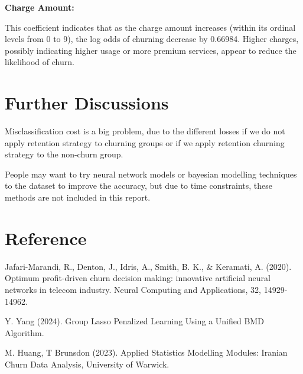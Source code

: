 \documentclass[11pt]{article}
\begin{document}
\textbf{Charge Amount: }

This coefficient indicates that as the charge amount increases (within its ordinal levels from 0 to 9), the log odds of churning decrease by 0.66984. Higher charges, possibly indicating higher usage or more premium services, appear to reduce the likelihood of churn.

\section{Further Discussions}

Misclassification cost is a big problem, due to the different losses if we do not apply retention strategy to churning groups or if we apply retention churning strategy to the non-churn group. 

People may want to try neural network models or bayesian modelling techniques to the dataset to improve the accuracy, but due to time constraints, these methods are not included in this report. 

\newpage

\section*{Reference}

Jafari-Marandi, R., Denton, J., Idris, A., Smith, B. K., & Keramati, A. (2020). Optimum profit-driven churn decision making: innovative artificial neural networks in telecom industry. Neural Computing and Applications, 32, 14929-14962. 

Y. Yang (2024). Group Lasso Penalized Learning Using a Unified BMD Algorithm. 

M. Huang, T Brunsdon (2023). Applied Statistics Modelling Modules: Iranian Churn Data Analysis, University of Warwick. 
\end{document}
